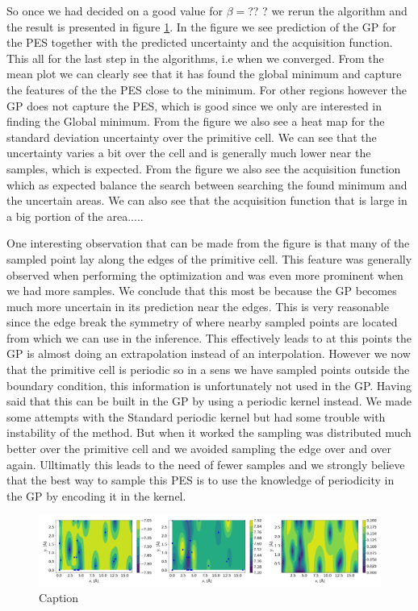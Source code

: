 \documentclass[11pt,a4paper]{article}
\begin{document}
So once we had decided on a good value for $\beta = $??
? we rerun the algorithm and the result is presented in figure \ref{fig:task3_pred}. In the figure we see prediction of the GP for the PES together with the predicted uncertainty and the acquisition function. This all for the last step in the algorithms, i.e when we converged. From the mean plot we can clearly see that it has found the global minimum and capture the features of the the PES close to the minimum. For other regions however the GP does not capture the PES, which is good since we only are interested in finding the Global minimum. From the figure we also see a heat map for the standard deviation uncertainty over the primitive cell. We can see that the uncertainty varies a bit over the cell and is generally much lower near the samples, which is expected. From the figure we also see the acquisition function which as expected balance the search between searching the found minimum and the uncertain areas. We can also see that the acquisition function that is large in a big portion of the area..... 


One interesting observation that can be made from the figure is that many of the sampled point lay along the edges of the primitive cell. This feature was generally observed when performing the optimization and was even more prominent when we had more samples. We conclude that this most be because the GP becomes much more uncertain in its prediction near the edges. This is very reasonable since the edge break the symmetry of where nearby sampled points are located from which we can use in the inference. This effectively leads to at this points the GP is almost doing an extrapolation instead of an interpolation. However we now that the primitive cell is periodic so in a sens we have sampled points outside the boundary condition, this information is unfortunately not used in the GP. Having said that this can be built in the GP by using a periodic kernel instead. We made some attempts with the Standard periodic kernel but had some trouble with instability of the method. But when it worked the sampling was distributed much better over the primitive cell and we avoided sampling the edge over and over again. Ulltimatly this leads to the need of fewer samples and we strongly believe that the best way to sample this PES is to use the knowledge of periodicity in the GP by encoding it in the kernel. 


\begin{figure}[H]
    \centering
    \includegraphics[width = 1\textwidth]{figures/task3_pred.png}
    \caption{Caption}
    \label{fig:task3_pred}
\end{figure}
\end{document}

